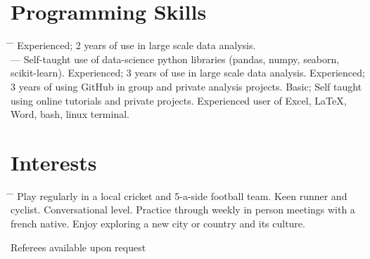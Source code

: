 \documentclass[10pt]{article} %
\begin{document}
\section{Programming Skills}
\begin{tabbing}
  \hspace{2mm} \= \hspace{18mm} \= \kill 
        {Experienced; 2 years of use in large scale data analysis.\\
                       \>\> --- Self-taught use of data-science python libraries (pandas, numpy, seaborn, scikit-learn).
  }
           {Experienced; 3 years of use in large scale data analysis.}
           {Experienced; 3 years of using GitHub in group and private analysis projects.}
           {Basic; Self taught using online tutorials and private projects.}
         {Experienced user of Excel, LaTeX, Word, bash, linux terminal.}
\end{tabbing}




\vspace{-7mm}
\section{Interests}

\begin{tabbing}
  \hspace{2mm} \= \hspace{18mm} \= \kill 
     {Play regularly in a local cricket and 5-a-side football team. Keen runner and cyclist.}
     {Conversational level. Practice through weekly in person meetings with a french native.}
     {Enjoy exploring a new city or country and its culture.}
\end{tabbing}

Referees available upon request


\newpage

\end{document}

